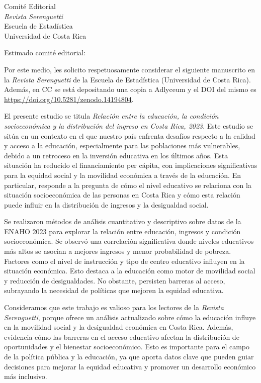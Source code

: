 \documentclass[11pt]{letter}
\date{\today}
\begin{document}
\begin{letter}{Comité Editorial\\ \textit{Revista Serenguetti}\\ Escuela de Estadística\\ Universidad de Costa Rica}

\opening{Estimado comité editorial:}

Por este medio, les solicito respetuosamente considerar el siguiente manuscrito en la \textit{Revista Serenguetti} de la Escuela de Estadística (Universidad de Costa Rica). Además, en CC se está depositando una copia a Adlyceum y el DOI del mismo es \href{https://doi.org/10.5281/zenodo.14194804}{https://doi.org/10.5281/zenodo.14194804}.

El presente estudio se titula \textit{Relación entre la educación, la condición socioeconómica y la distribución del ingreso en Costa Rica, 2023}. Este estudio se sitúa en un contexto en el que nuestro país enfrenta desafíos respecto a la calidad y acceso a la educación, especialmente para las poblaciones más vulnerables, debido a un retroceso en la inversión educativa en los últimos años. Esta situación ha reducido el financiamiento per cápita, con implicaciones significativas para la equidad social y la movilidad económica a través de la educación. En particular, responde a la pregunta de cómo el nivel educativo se relaciona con la situación socioeconómica de las personas en Costa Rica y cómo esta relación puede influir en la distribución de ingresos y la desigualdad social.

Se realizaron métodos de análisis cuantitativo y descriptivo sobre datos de la ENAHO 2023 para explorar la relación entre educación, ingresos y condición socioeconómica. Se observó una correlación significativa donde niveles educativos más altos se asocian a mejores ingresos y menor probabilidad de pobreza. Factores como el nivel de instrucción y tipo de centro educativo influyen en la situación económica. Esto destaca a la educación como motor de movilidad social y reducción de desigualdades. No obstante, persisten barreras al acceso, subrayando la necesidad de políticas que mejoren la equidad educativa.

Consideramos que este trabajo es valioso para los lectores de la \textit{Revista Serenguetti}, porque ofrece un análisis actualizado sobre cómo la educación influye en la movilidad social y la desigualdad económica en Costa Rica. Además, evidencia cómo las barreras en el acceso educativo afectan la distribución de oportunidades y el bienestar socioeconómico. Esto es importante para el campo de la política pública y la educación, ya que aporta datos clave que pueden guiar decisiones para mejorar la equidad educativa y promover un desarrollo económico más inclusivo.


\end{letter}
\end{document}
